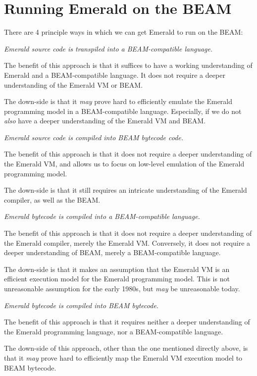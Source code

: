 \section{Running Emerald on the BEAM}

There are 4 principle ways in which we can get Emerald to run on the
BEAM:

\begin{description}[style=nextline]

\item[Source-to-Source] \emph{Emerald source code is transpiled into a
BEAM-compatible language.}

The benefit of this approach is that it suffices to have a working
understanding of Emerald and a BEAM-compatible language. It does not
require a deeper understanding of the Emerald VM or BEAM.

The down-side is that it \emph{may} prove hard to efficiently emulate
the Emerald programming model in a BEAM-compatible language.
Especially, if we do not \emph{also} have a deeper understanding of
the Emerald VM and BEAM.

\item[Source-to-Bytecode] \emph{Emerald source code is compiled into
BEAM bytecode code.}

The benefit of this approach is that it does not require a deeper
understanding of the Emerald VM, and allows us to focus on low-level
emulation of the Emerald programming model.

The down-side is that it still requires an intricate understanding
of the Emerald compiler, as well as the BEAM.

\item[Bytecode-to-Source] \emph{Emerald bytecode is compiled into a
BEAM-compatible language.}

The benefit of this approach is that it does not require a deeper
understanding of the Emerald compiler, merely the Emerald VM.
Conversely, it does not require a deeper understanding of BEAM, merely
a BEAM-compatible language.

The down-side is that it makes an assumption that the Emerald VM is an
efficient execution model for the Emerald programming model. This is
not unreasonable assumption for the early 1980s, but \emph{may} be
unreasonable today.

\item[Bytecode-to-Bytecode] \emph{Emerald bytecode is compiled into
BEAM bytecode.}

The benefit of this approach is that it requires neither a deeper
understanding of the Emerald programming language, nor a
BEAM-compatible language.

The down-side of this approach, other than the one mentioned directly
above, is that it \emph{may} prove hard to efficiently map the Emerald
VM execution model to BEAM bytecode.

\end{description}
